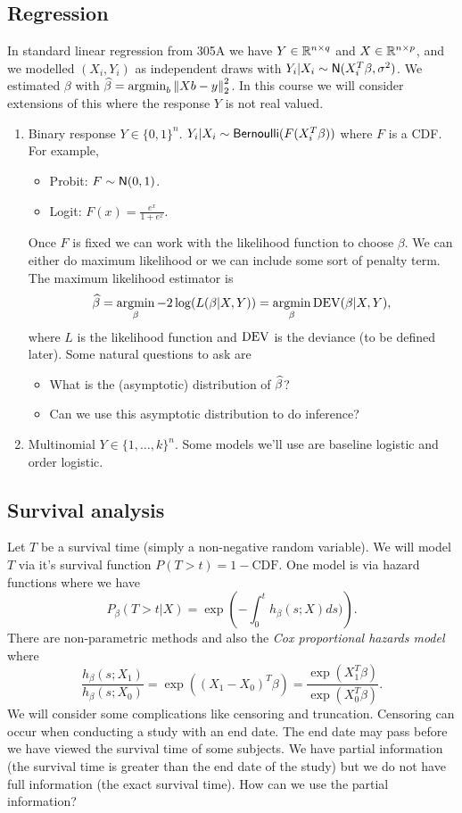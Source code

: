 \subsection{Regression}
In standard linear regression from 305A we have $Y \in {\mathbb R}^{n \times q}$ and $X \in {\mathbb R}^{n \times p}$, and we modelled $(X_i,Y_i)$ as independent draws with $Y_i |X_i \sim \mathsf{N}(X_i^T\beta,\sigma^2)$. We estimated $\beta$ with $\widehat{\beta} = \operatorname*{argmin}_b \left\|Xb-y\right\|_2^2$. In this course we will consider extensions of this  where the response $Y$ is not real valued.
\begin{enumerate}
    \item Binary response $Y \in \{0,1\}^n$. $Y_i|X_i \sim \mathsf{Bernoulli}(F(X_i^T\beta))$ where $F$ is a CDF. For example,
    \begin{itemize}
        \item Probit: $F \sim \mathsf{N}(0,1)$.
        \item Logit: $F(x) = \frac{e^x}{1+e^x}$.
    \end{itemize}
    Once $F$ is fixed we can work with the likelihood function to choose $\beta$. We can either do maximum likelihood or we can include some sort of penalty term. The maximum likelihood estimator is
    \[\widehat{\beta} = \operatorname*{argmin}_\beta -2\log(L(\beta|X,Y)) = \operatorname*{argmin}_\beta \operatorname{DEV}(\beta | X,Y), \]
    where $L$ is the likelihood function and $\operatorname{DEV}$ is the deviance (to be defined later). Some natural questions to ask are
    \begin{itemize}
        \item What is the (asymptotic) distribution of $\widehat{\beta}$?
        \item Can we  use this asymptotic distribution to do inference?
    \end{itemize}
    \item Multinomial $Y \in \{1,\ldots, k\}^n$. Some models we'll use are baseline logistic and order logistic.
\end{enumerate}
\subsection{Survival analysis}
Let $T$ be a survival time (simply a non-negative random variable). We will model $T$ via it's survival function $P(T > t) = 1-\text{CDF}$. One model is via hazard functions where we have
\[P_\beta(T > t |X) = \exp\left(-\int_0^t h_\beta(s;X)ds)\right). \]
There are non-parametric methods and also the \emph{Cox proportional hazards model} where
\[\frac{h_\beta(s;X_1)}{h_\beta(s;X_0)} = \exp\left((X_1-X_0)^T\beta\right) = \frac{\exp(X_1^T\beta)}{\exp(X_0^T\beta)}. \]
We will consider some complications like censoring and truncation. Censoring can occur when conducting a study with an end date. The end date may pass before we have viewed the survival time of some subjects. We have partial information (the survival time is greater than the end date of the study) but we do not have full information (the exact survival time). How can we use the partial information?
